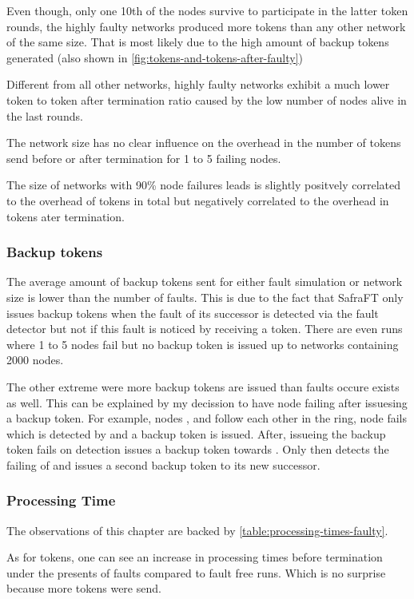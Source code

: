 Even though, only one 10th of the nodes survive to participate in the latter token rounds, the highly faulty networks produced more tokens than any other network of the same size.
That is most likely due to the high amount of backup tokens generated (also shown in \cref{fig:tokens-and-tokens-after-faulty})

Different from all other networks, highly faulty networks exhibit a much lower token to token after termination ratio caused by the low number of nodes alive in the last rounds.

The network size has no clear influence on the overhead in the number of tokens send before or after termination for 1 to 5 failing nodes.

The size of networks with 90\% node failures leads is slightly positvely correlated to the overhead of tokens in total but negatively correlated to the overhead in tokens ater termination.
    
\subsubsection{Backup tokens}
The average amount of backup tokens sent for either fault simulation or network size is lower than the number of faults.
This is due to the fact that SafraFT only issues backup tokens when the fault of its successor is detected via the fault detector but not if this fault is noticed by receiving a token.
There are even runs where 1 to 5 nodes fail but no backup token is issued up to networks containing 2000 nodes. 

The other extreme were more backup tokens are issued than faults occure exists as well.
This can be explained by my decission to have node failing after issuesing a backup token.
For example, nodes ,  and  follow each other in the ring, node  fails which is detected by  and a backup token is issued.
After, issueing the backup token  fails on detection  issues a backup token towards .
Only then  detects the failing of  and issues a second backup token to its new successor.  


\subsubsection{Processing Time}
The observations of this chapter are backed by \cref{table:processing-times-faulty}.

As for tokens, one can see an increase in processing times before termination under the presents of faults compared to fault free runs. Which is no surprise because more tokens were send.


